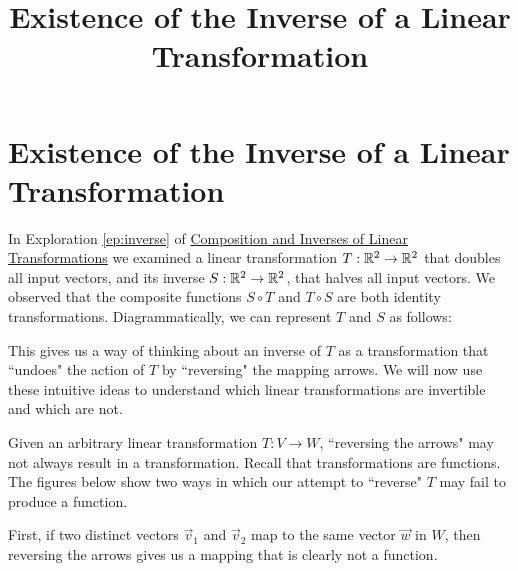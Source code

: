 \documentclass{ximera}
\title{Existence of the Inverse of a Linear Transformation} \license{CC BY-NC-SA 4.0}
\begin{document}
\begin{abstract}
 \end{abstract}
\maketitle

\section*{Existence of the Inverse of a Linear Transformation}

In Exploration \ref{ep:inverse} of \href{\xmbaseurl/LTR-0030/main}{Composition and Inverses of Linear Transformations} we examined a linear transformation $T:\mathbb{R}^2\rightarrow \mathbb{R}^2$ that doubles all input vectors, and its inverse $S:\mathbb{R}^2\rightarrow \mathbb{R}^2$, that halves all input vectors.  We observed that the composite functions $S\circ T$ and $T\circ S$ are both identity transformations.  Diagrammatically, we can represent $T$ and $S$ as follows:
 
\begin{center}
 \end{center} 

This gives us a way of thinking about an inverse of $T$ as a transformation that ``undoes" the action of $T$ by ``reversing" the mapping arrows.  We will now use these intuitive ideas to understand which linear transformations are invertible and which are not.

Given an arbitrary linear transformation $T:V\rightarrow W$, ``reversing the arrows"
 may not always result in a transformation. Recall that transformations are functions.  The figures below show two ways in which our attempt to ``reverse" $T$ may fail to produce a function.
 
 First, if two distinct vectors $\vec{v}_1$ and $\vec{v}_2$ map to the same vector $\vec{w}$ in $W$, then reversing the arrows gives us a mapping that is clearly not a function. 
 

\begin{center}
 \end{center} 
 
\end{document}
